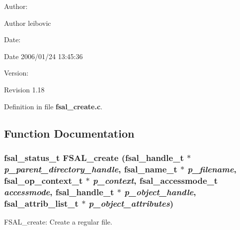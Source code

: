 \begin{Desc}
\item[Author:]\end{Desc}
\begin{Desc}
\item[Author]leibovic \end{Desc}
\begin{Desc}
\item[Date:]\end{Desc}
\begin{Desc}
\item[Date]2006/01/24 13:45:36 \end{Desc}
\begin{Desc}
\item[Version:]\end{Desc}
\begin{Desc}
\item[Revision]1.18 \end{Desc}


Definition in file {\bf fsal\_\-create.c}.

\subsection{Function Documentation}
\subsubsection[{FSAL\_\-create}]{\setlength{\rightskip}{0pt plus 5cm}fsal\_\-status\_\-t FSAL\_\-create (fsal\_\-handle\_\-t $\ast$ {\em p\_\-parent\_\-directory\_\-handle}, \/  fsal\_\-name\_\-t $\ast$ {\em p\_\-filename}, \/  fsal\_\-op\_\-context\_\-t $\ast$ {\em p\_\-context}, \/  fsal\_\-accessmode\_\-t {\em accessmode}, \/  fsal\_\-handle\_\-t $\ast$ {\em p\_\-object\_\-handle}, \/  fsal\_\-attrib\_\-list\_\-t $\ast$ {\em p\_\-object\_\-attributes})}\label{fsal__create_8c_8b82067d8e5021afb2096ff913fcd47e}


FSAL\_\-create: Create a regular file.

